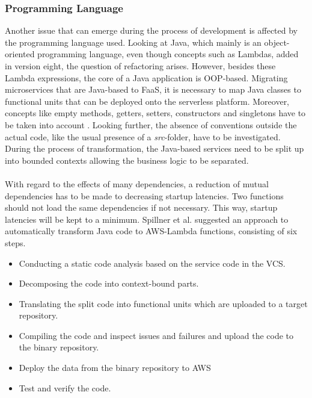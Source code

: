 \documentclass[a4paper,11pt, pagesize]{scrartcl}
\begin{document}
\begin{spacing}{1.2}
\subsubsection{Programming Language}
Another issue that can emerge during the process of development is affected by the programming language used. Looking at Java, which mainly is an object-oriented programming language, even though concepts such as Lambdas, added in version eight, the question of refactoring arises. However, besides these Lambda expressions, the core of a Java application is OOP-based. Migrating microservices that are Java-based to FaaS, it is necessary to map Java classes to functional units that can be deployed onto the serverless platform. Moreover, concepts like empty methods, getters, setters, constructors and singletons have to be taken into account \cite{spillner2017Java}. Looking further, the absence of conventions outside the actual code, like the usual presence of a \textit{src}-folder, have to be investigated. During the process of transformation, the Java-based services need to be split up into bounded contexts allowing the business logic to be separated.\\\\With regard to the effects of many dependencies, a reduction of mutual dependencies has to be made to decreasing startup latencies. Two functions should not load the same dependencies if not necessary. This way, startup latencies will be kept to a minimum. Spillner et al. suggested an approach to automatically transform Java code to AWS-Lambda functions, consisting of six steps.
\begin{itemize}
  \item[1.] Conducting a static code analysis based on the service code in the VCS.
  \item[2.] Decomposing the code into context-bound parts.
  \item[3.] Translating the split code into functional units which are uploaded to a target repository. 
  \item[4.] Compiling the code and inspect issues and failures and upload the code to the binary repository. 
  \item[5.] Deploy the data from the binary repository to AWS
  \item[6.] Test and verify the code.
\end{itemize}

\end{spacing}
\end{document}
